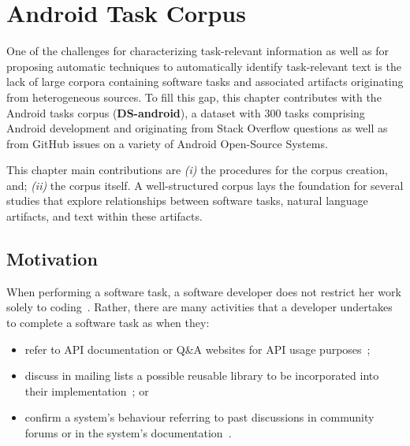 \setcounter{chapter}{3}
\setcounter{rq}{1}


\chapter{Android Task Corpus}
\label{ch:android-corpus}



One of the challenges for characterizing task-relevant information as well as for proposing automatic techniques to automatically identify task-relevant text is
the lack of large corpora containing
software tasks and associated artifacts originating from heterogeneous sources.
To fill this gap, this chapter contributes with the Android tasks corpus (\textbf{\acs{DS-android}}), a dataset with 300 tasks comprising Android development and originating from Stack Overflow questions
as well as from GitHub issues on a variety of Android Open-Source Systems.



This chapter main contributions are \textit{(i)} the procedures for the corpus creation, and; \textit{(ii)} the corpus itself. A well-structured corpus lays the foundation for several studies that explore relationships between software tasks, natural language artifacts, and text within these artifacts. 




\section{Motivation}
\label{cp4:motivation}


When performing a software task, a software developer does not restrict her work
solely to coding~\cite{Meyer2017}.
Rather, there are many activities that a developer undertakes to complete a software task
as when they:



\begin{itemize}
    \item refer to API documentation or Q\&A websites for API usage purposes~\cite{umarji2008archetypal, Singer1998, robillard2011field};
    \item discuss in mailing lists a possible reusable library to be incorporated into their implementation~\cite{umarji2008archetypal, Bacchelli2012}; or
    \item confirm a system's behaviour referring to past discussions in community forums or in the system's documentation~\cite{Arya2019, Lotufo2012, Singer1998}.
\end{itemize}


